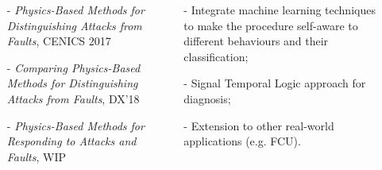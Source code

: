\documentclass{tikzposter}
\begin{document}
	\begin{columns}
		{
			{
				\begin{itemize}
					\item[-]{\textit{Physics-Based Methods for Distinguishing Attacks from Faults}, CENICS 2017}
					\item[-]{\textit{Comparing Physics-Based Methods for Distinguishing Attacks from Faults}, DX'18}
					\item[-]{\textit{Physics-Based Methods for Responding to Attacks and Faults}, WIP}
				\end{itemize}
			}
		}
		{
			{
				\begin{itemize}
					\item[-]{Integrate machine learning techniques to make the
						procedure self-aware to different behaviours and their
						classification;}
					\item[-]{Signal Temporal Logic approach for diagnosis;}
					\item[-]{Extension to other real-world applications (e.g. FCU).}
				\end{itemize}
			}
		}
	\end{columns}
\end{document}
